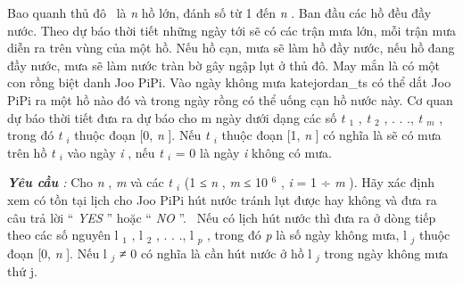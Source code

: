 Bao quanh thủ đô  là \emph{ n } hồ lớn, đánh số từ 1 đến \emph{ n } . Ban đầu các hồ đều đầy nước. Theo dự báo thời tiết những ngày tới sẽ có các trận mưa lớn, mỗi trận mưa diễn ra trên vùng của một hồ. Nếu hồ cạn, mưa sẽ làm hồ đầy nước, nếu hồ đang đầy nước, mưa sẽ làm nước tràn bờ gây ngập lụt ở thủ đô. May mắn là có một con rồng biệt danh Joo PiPi. Vào ngày không mưa katejordan\_ts có thể dắt Joo PiPi ra một hồ nào đó và trong ngày rồng có thể uống cạn hồ nước này. Cơ quan dự báo thời tiết đưa ra dự báo cho m ngày dưới dạng các số \emph{ t $_ 1 $} , \emph{ t $_ 2 $} , . . ., \emph{ t $_ m $} , trong đó \emph{ t $_ i $} thuộc đoạn [0, \emph{ n } ]. Nếu \emph{ t $_ i $} thuộc đoạn [1, \emph{ n } ] có nghĩa là sẽ có mưa trên hồ \emph{ t $_ i $} vào ngày \emph{ i } , nếu \emph{ t $_ i $} = 0 là ngày \emph{ i } không có mưa.

\emph{\textbf{Yêu cầu } : } Cho \emph{ n } , \emph{ m } và các \emph{ t $_ i $} (1 ≤ \emph{ n } , \emph{ m } ≤ 10 $^ 6 $ , \emph{ i } = 1 ÷ \emph{ m } ). Hãy xác định xem có tồn tại lịch cho Joo PiPi hút nước tránh lụt được hay không và đưa ra câu trả lời “ \emph{ YES } ” hoặc “ \emph{ NO } ”.  Nếu có lịch hút nước thì đưa ra ở dòng tiếp theo các số nguyên l $_ 1 $ , l $_ 2 $ , . . ., l \emph{$_ p $} , trong đó \emph{ p } là số ngày không mưa, l \emph{$_ j $} thuộc đoạn [0, \emph{ n } ]. Nếu l \emph{$_ j $} ≠ 0 có nghĩa là cần hút nước ở hồ l \emph{$_ j $} trong ngày không mưa thứ j.